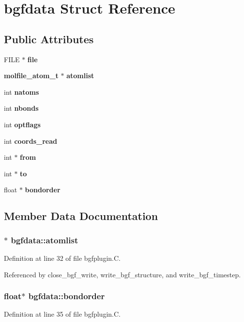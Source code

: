 \section{bgfdata  Struct Reference}
\label{structbgfdata}
\subsection*{Public Attributes}
\begin{CompactItemize}
\item 
FILE $\ast$ {\bf file}
\item 
{\bf molfile\_\-atom\_\-t} $\ast$ {\bf atomlist}
\item 
int {\bf natoms}
\item 
int {\bf nbonds}
\item 
int {\bf optflags}
\item 
int {\bf coords\_\-read}
\item 
int $\ast$ {\bf from}
\item 
int $\ast$ {\bf to}
\item 
float $\ast$ {\bf bondorder}
\end{CompactItemize}


\subsection{Member Data Documentation}
\subsubsection{$\ast$ bgfdata::atomlist}\label{structbgfdata_m1}




Definition at line 32 of file bgfplugin.C.

Referenced by close\_\-bgf\_\-write, write\_\-bgf\_\-structure, and write\_\-bgf\_\-timestep.
\subsubsection{\setlength{\rightskip}{0pt plus 5cm}float$\ast$ bgfdata::bondorder}\label{structbgfdata_m8}




Definition at line 35 of file bgfplugin.C.

